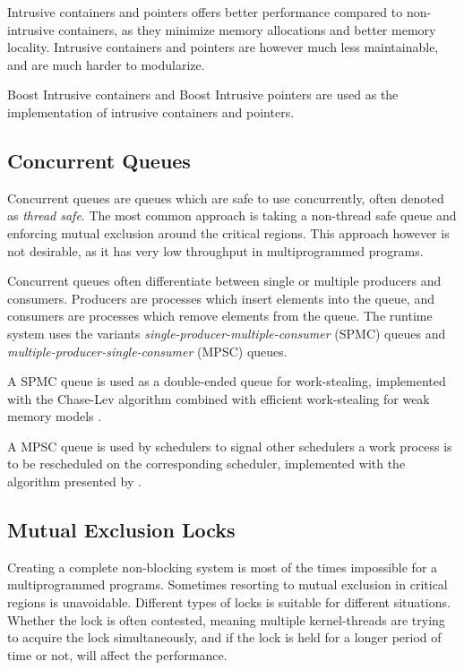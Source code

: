 Intrusive containers and pointers offers better performance compared to non\hyp{}intrusive containers, as they minimize memory allocations and better memory locality. Intrusive containers and pointers are however much less maintainable, and are much harder to modularize.

Boost Intrusive containers and Boost Intrusive pointers are used as the implementation of intrusive containers and pointers.


\subsection{Concurrent Queues}


Concurrent queues are queues which are safe to use concurrently, often denoted as \textit{thread safe}. The most common approach is taking a non\hyp{}thread safe queue and enforcing mutual exclusion around the critical regions. This approach however is not desirable, as it has very low throughput in multiprogrammed programs.

Concurrent queues often differentiate between single or multiple producers and consumers. Producers are processes which insert elements into the queue, and consumers are processes which remove elements from the queue. The runtime system uses the variants \textit{single\hyp{}producer\hyp{}multiple\hyp{}consumer} (SPMC) queues and \textit{multiple\hyp{}producer\hyp{}single\hyp{}consumer} (MPSC) queues.

A SPMC queue is used as a double\hyp{}ended queue for work\hyp{}stealing, implemented with the Chase\hyp{}Lev algorithm \citep{chase2005dynamic} combined with efficient work\hyp{}stealing for weak memory models \citep{le2013correct}.

A MPSC queue is used by schedulers to signal other schedulers a work process is to be rescheduled on the corresponding scheduler, implemented with the algorithm presented by \citet{vyukov2014intrusive}. 


\subsection{Mutual Exclusion Locks}


Creating a complete non\hyp{}blocking system is most of the times impossible for a multiprogrammed programs. Sometimes resorting to mutual exclusion in critical regions is unavoidable. Different types of locks is suitable for different situations. Whether the lock is often contested, meaning multiple kernel\hyp{}threads are trying to acquire the lock simultaneously, and if the lock is held for a longer period of time or not, will affect the performance. 

